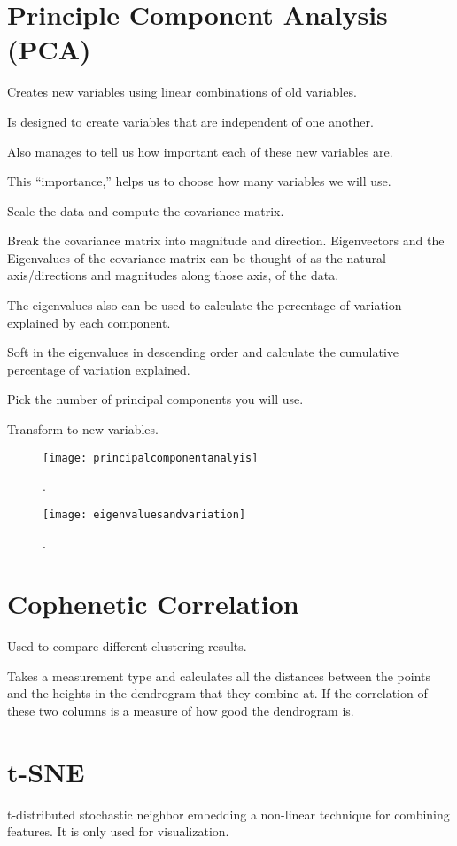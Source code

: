 	\section{Principle Component Analysis (PCA)}
	\begin{bulletedlist}
		\item Creates new variables using linear combinations of old variables.
		\item Is designed to create variables that are independent of one another.
		\item Also manages to tell us how important each of these new variables are.
		\item This ``importance,'' helps us to choose how many variables we will use.
		\item Scale the data and compute the covariance matrix.
		\item Break the covariance matrix into magnitude and direction. Eigenvectors and the Eigenvalues of the covariance matrix can be thought of as the natural axis/directions and magnitudes along those axis, of the data.
		\begin{bulletedlist}
			\item The eigenvalues also can be used to calculate the percentage of variation explained by each component.
		\end{bulletedlist}
		\item Soft in the eigenvalues in descending order and calculate the cumulative percentage of variation explained.
		\item Pick the number of principal components you will use.
		\item Transform to new variables.
	\end{bulletedlist}

	\begin{figure}[h]
		\centering
		\texttt{[image: principalcomponentanalyis]}
		\caption{.}
		\label{fig:principalcomponentanalyis}
	\end{figure}
 	\begin{figure}[h]
		\centering
		\texttt{[image: eigenvaluesandvariation]}
		\caption{.}
		\label{fig:eigenvaluesandvariation}
	\end{figure}

	\section{Cophenetic Correlation}
Used to compare different clustering results.

Takes a measurement type and calculates all the distances between the points and the heights in the dendrogram that they combine at.  If the correlation of these two columns is a measure of how good the dendrogram is.

	\section{t-SNE}
t-distributed stochastic neighbor embedding a non-linear technique for combining features.  It is only used for visualization.